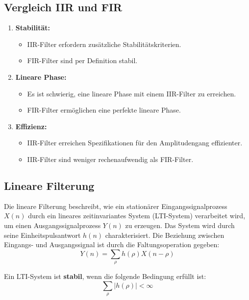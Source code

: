 \documentclass[12pt]{article}
\begin{document}
   \subsection*{Vergleich IIR und FIR}
      \begin{enumerate}
         \item \textbf{Stabilität:}
         \begin{itemize}
            \item IIR-Filter erfordern zusätzliche Stabilitätskriterien.
            \item FIR-Filter sind per Definition stabil.
         \end{itemize}
         \item \textbf{Lineare Phase:}
         \begin{itemize}
            \item Es ist schwierig, eine lineare Phase mit einem IIR-Filter zu erreichen.
            \item FIR-Filter ermöglichen eine perfekte lineare Phase.
         \end{itemize}
         \item \textbf{Effizienz:}
         \begin{itemize}
            \item IIR-Filter erreichen Spezifikationen für den Amplitudengang effizienter.
            \item IIR-Filter sind weniger rechenaufwendig als FIR-Filter.
         \end{itemize}
      \end{enumerate}

   \newpage
   \subsection{Lineare Filterung}

      Die lineare Filterung beschreibt, wie ein stationärer Eingangssignalprozess \(X(n)\) durch ein lineares zeitinvariantes System (LTI-System) verarbeitet wird, um einen Ausgangssignalprozess \(Y(n)\) zu erzeugen. Das System wird durch seine Einheitspulsantwort \(h(n)\) charakterisiert. Die Beziehung zwischen Eingangs- und Ausgangssignal ist durch die Faltungsoperation gegeben:
      \[
         Y(n) = \sum_{\rho} h(\rho) X(n-\rho)
      \]

      Ein LTI-System ist \textbf{stabil}, wenn die folgende Bedingung erfüllt ist:
      \[
         \sum_\rho |h(\rho)| < \infty
      \]
\end{document}

